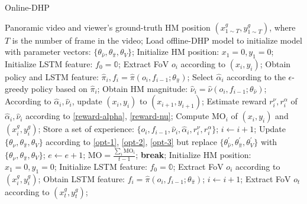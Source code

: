 \documentclass[10pt,journal,compsoc]{IEEEtran}
\begin{document}
\begin{algorithm}
   \caption{Online-DHP}
   \label{online-DHP-algorithm}
\begin{algorithmic}
    Panoramic video and viewer's ground-truth HM position $(x^{g}_{1 \sim T},y^{g}_{1 \sim T})$, where $T$ is the number of frame in the video;
   \STATE Load offline-DHP model to initialize model with parameter vectors: $\{ \theta_{\hat{\nu}}, \theta_{\hat{\pi}}, \theta_{V} \}$;
           \STATE Initialize HM position: $x_1=0,y_1=0$;
           \STATE Initialize LSTM feature: $f_0=\mathbb{0}$;
               \STATE Extract FoV $o_i$ according to $(x_{i},y_{i})$;
               \STATE Obtain policy and LSTM feature: $\hat{\pi}_{i}, f_{i}=\hat{\pi}( o_{i}, f_{i-1} ; \theta_{\hat{\pi}})$;
               \STATE Select $\hat{\alpha}_{i}$ according to the $\epsilon$-greedy policy based on $\hat{\pi}_{i}$;
               \STATE Obtain HM magnitude: $\hat{\nu}_{i}=\hat{\nu}(o_{i}, f_{i-1} ; \theta_{\hat{\nu}})$;
               \STATE According to $\hat{\alpha}_{i},\hat{\nu}_{i}$, update $(x_{i}, y_{i})$ to $(x_{i+1}, y_{i+1})$;
               \STATE Estimate reward $r^{\nu}_{i},\! r^{\alpha}_{i}$ of $\hat{\alpha}_{i},\hat{\nu}_{i}$ according to \eqref{reward-alpha}, \eqref{reward-nu};
               \STATE Compute $\text{MO}_i$ of $(x_{i},y_{i})$ and $(x^{g}_{i},y^{g}_{i})$;
               \STATE Store a set of experience: $\{ o_{i}, \! f_{i-1},\! \hat{\nu}_{i},\! \hat{\alpha}_{i},\! r^{\nu}_{i},\! r^{\alpha}_{i} \}$;
               \STATE $i \leftarrow i+1$;
           \ENDFOR
           \STATE Update $\{ \theta_{\hat{\nu}}, \theta_{\hat{\pi}}, \theta_{V} \}$ according to \eqref{opt-1}, \eqref{opt-2}, \eqref{opt-3} but replace $\{ \theta^{'}_{\hat{\nu}}, \theta^{'}_{\hat{\pi}}, \theta^{'}_{V} \}$ with $\{ \theta_{\hat{\nu}}, \theta_{\hat{\pi}}, \theta_{V} \}$;
           \STATE $e \leftarrow e+1$;
           \STATE $\text{MO} =  \frac{\sum_{i} \text{MO}_{i}}{t-1}$;
               \STATE \textbf{break};
           \ENDIF
       \ENDFOR
       \STATE Initialize HM position: $x_1=0,y_1=0$;
       \STATE Initialize LSTM feature: $f_0=\mathbb{0}$;
           \STATE Extract FoV $o_i$ according to $(x^{g}_{i},y^{g}_{i})$;
           \STATE Obtain LSTM feature: $f_{i}=\hat{\pi}( o_{i}, f_{i-1} ; \theta_{\hat{\pi}})$;
           \STATE $i \leftarrow i+1$;
       \ENDFOR
       \STATE Extract FoV $o_t$ according to $(x^{g}_{t},y^{g}_{t})$;

\end{algorithmic}
\end{algorithm}
\end{document}
